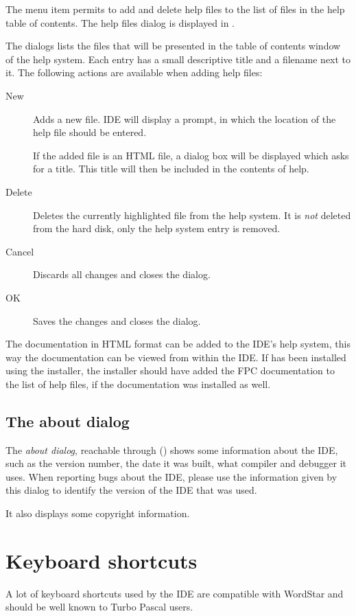 The menu item  permits to add and delete help files to the
list of files in the help table of contents.
The help files dialog is displayed in .


The dialogs lists the files that will be presented in the table of contents
window of the help system. Each entry has a small descriptive title and a
filename next to it. The following actions are available when adding help
files:
\begin{description}
\item[New] Adds a new file. IDE will display a prompt, in which the 
location of the help file should be entered. 

If the added file is an HTML file, a dialog box will be displayed
which asks for a title. This title will then be included in the
contents of help.
\item[Delete] Deletes the currently highlighted file from the help system.
It is \emph{not} deleted from the hard disk, only the help system entry is
removed.
\item[Cancel] Discards all changes and closes the dialog.
\item[OK] Saves the changes and closes the dialog.
\end{description}

The \fpc documentation in HTML format can be added to the IDE's help system,
this way the documentation can be viewed from within the IDE. If \fpc has
been installed using the installer, the installer should have added the 
FPC documentation to the list of help files, if the documentation was
installed as well.

%
%
\subsection{The about dialog}
\label{se:about}
The {\em about dialog}, reachable through () shows some 
information about the IDE, such as the version number, the date it was built,
what compiler and debugger it uses. When reporting bugs about the IDE, please 
use the information given by this dialog to identify the version of the IDE
that was used.

It also displays some copyright information.

\section{Keyboard shortcuts}
\label{se:keyshortcuts}
A lot of keyboard shortcuts used by the IDE are compatible with 
WordStar and should be well known to Turbo Pascal users.

